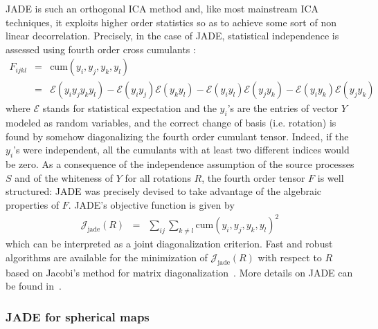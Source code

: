 JADE is such an orthogonal ICA method and, like most mainstream ICA techniques, it exploits higher order statistics so as to achieve some 
sort of non linear decorrelation. Precisely, in the case of JADE, statistical independence is assessed using fourth order cross cumulants : 
\begin{eqnarray} \nonumber
F_{ijkl} & = & \textrm{cum}( y_i, y_j, y_k, y_l ) \nonumber \\
 & = & \mathcal{E} (y_i y_j y_k y_l) - \mathcal{E} (y_i y_j)\mathcal{E} (y_k y_l) -\mathcal{E} (y_iy_l)\mathcal{E} ( y_j y_k)-\mathcal{E} (y_iy_k)\mathcal{E} (y_j y_k)
\end{eqnarray}
where $\mathcal{E}$ stands for statistical expectation and the $y_i$'s are the entries of vector $Y$ modeled as random variables, 
and the correct change of basis (i.e. rotation) is found by somehow diagonalizing the fourth order cumulant tensor. 
Indeed, if the $y_i$'s were independent, all the cumulants with at least two different indices would be zero. As a consequence of 
the independence assumption of the source processes $S$ and of the whiteness of $Y$ for all rotations $R$, the fourth order 
tensor $F$ is well structured: JADE was precisely devised to take advantage of the algebraic properties of $F$. JADE's objective 
function is given by
\begin{eqnarray}  \nonumber	 
  \mathcal{J}_{\textrm{jade}}( R ) & =&  \sum _{ij}   \sum_{k \ne l} \textrm{cum}(  y_i, y_j, y_k, y_l )^2  
\end{eqnarray}
which can be interpreted as a joint diagonalization criterion. Fast and robust algorithms are available for the minimization 
of $\mathcal{J}_{\textrm{jade}}( R )$ with respect to $R$ based on Jacobi's method for matrix diagonalization~\citep{ica:pham2001}. 
More details on JADE can be found in~\citep{ica:jade,ica:tutorial,ica:icabook}.


\subsubsection{JADE for spherical maps}


